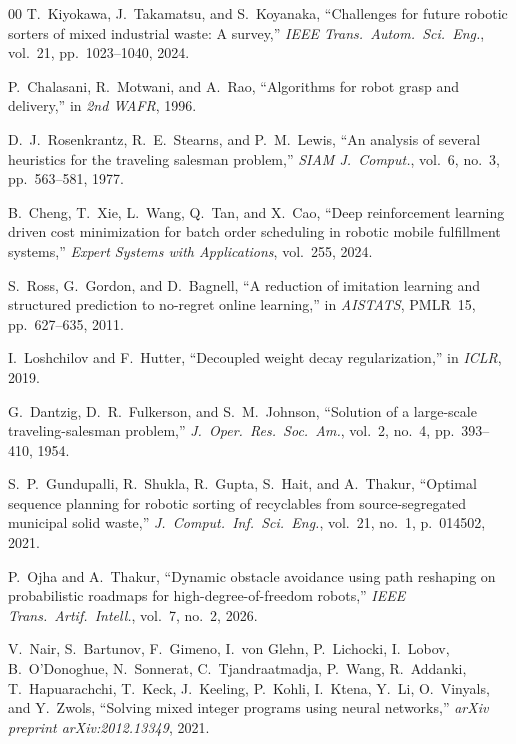 \documentclass[conference]{IEEEtran}
\begin{document}
\begin{thebibliography}{00}
 T.~Kiyokawa, J.~Takamatsu, and S.~Koyanaka, ``Challenges for future robotic sorters of mixed industrial waste: A survey,'' \emph{IEEE Trans.\ Autom.\ Sci.\ Eng.}, vol.~21, pp.~1023--1040, 2024.

 P.~Chalasani, R.~Motwani, and A.~Rao, ``Algorithms for robot grasp and delivery,'' in \emph{2nd WAFR}, 1996.

 D.~J.~Rosenkrantz, R.~E.~Stearns, and P.~M.~Lewis, ``An analysis of several heuristics for the traveling salesman problem,'' \emph{SIAM J.\ Comput.}, vol.~6, no.~3, pp.~563--581, 1977.

 B.~Cheng, T.~Xie, L.~Wang, Q.~Tan, and X.~Cao, ``Deep reinforcement learning driven cost minimization for batch order scheduling in robotic mobile fulfillment systems,'' \emph{Expert Systems with Applications}, vol.~255, 2024.

 S.~Ross, G.~Gordon, and D.~Bagnell, ``A reduction of imitation learning and structured prediction to no-regret online learning,'' in \emph{AISTATS}, PMLR~15, pp.~627--635, 2011.

 I.~Loshchilov and F.~Hutter, ``Decoupled weight decay regularization,'' in \emph{ICLR}, 2019.

 G.~Dantzig, D.~R.~Fulkerson, and S.~M.~Johnson, ``Solution of a large-scale traveling-salesman problem,'' \emph{J.\ Oper.\ Res.\ Soc.\ Am.}, vol.~2, no.~4, pp.~393--410, 1954.

 S.~P.~Gundupalli, R.~Shukla, R.~Gupta, S.~Hait, and A.~Thakur, ``Optimal sequence planning for robotic sorting of recyclables from source-segregated municipal solid waste,'' \emph{J.\ Comput.\ Inf.\ Sci.\ Eng.}, vol.~21, no.~1, p.~014502, 2021.

 P.~Ojha and A.~Thakur, ``Dynamic obstacle avoidance using path reshaping on probabilistic roadmaps for high-degree-of-freedom robots,'' \emph{IEEE Trans.\ Artif.\ Intell.}, vol.~7, no.~2, 2026.

 V.~Nair, S.~Bartunov, F.~Gimeno, I.~von Glehn, P.~Lichocki, I.~Lobov, B.~O'Donoghue, N.~Sonnerat, C.~Tjandraatmadja, P.~Wang, R.~Addanki, T.~Hapuarachchi, T.~Keck, J.~Keeling, P.~Kohli, I.~Ktena, Y.~Li, O.~Vinyals, and Y.~Zwols, ``Solving mixed integer programs using neural networks,'' \emph{arXiv preprint arXiv:2012.13349}, 2021.


\end{thebibliography}
\end{document}
